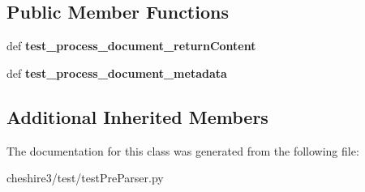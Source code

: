 \subsection*{Public Member Functions}
\begin{DoxyCompactItemize}
\item 
\hypertarget{classcheshire3_1_1test_1_1test_pre_parser_1_1_data_checksum_pre_parser_test_case_a6dd37674e4d1cd005440d15d7a25641f}{def {\bfseries test\-\_\-process\-\_\-document\-\_\-return\-Content}}\label{classcheshire3_1_1test_1_1test_pre_parser_1_1_data_checksum_pre_parser_test_case_a6dd37674e4d1cd005440d15d7a25641f}

\item 
\hypertarget{classcheshire3_1_1test_1_1test_pre_parser_1_1_data_checksum_pre_parser_test_case_a8219c8caaa2eb729129a0f040e0b3bc1}{def {\bfseries test\-\_\-process\-\_\-document\-\_\-metadata}}\label{classcheshire3_1_1test_1_1test_pre_parser_1_1_data_checksum_pre_parser_test_case_a8219c8caaa2eb729129a0f040e0b3bc1}

\end{DoxyCompactItemize}
\subsection*{Additional Inherited Members}


The documentation for this class was generated from the following file\-:\begin{DoxyCompactItemize}
\item 
cheshire3/test/test\-Pre\-Parser.\-py\end{DoxyCompactItemize}
